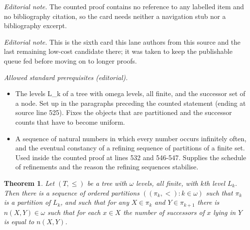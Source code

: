 \documentclass[10pt,a4paper]{amsart}
\newtheorem{theorem}{Theorem}[section]
\begin{document}
\noindent\textit{Editorial note.} The counted proof contains no reference to any labelled item and no bibliography citation, so the card needs neither a navigation stub nor a bibliography excerpt.\par\medskip
\noindent\textit{Editorial note.} This is the sixth card this lane authors from this source and the last remaining low-cost candidate there; it was taken to keep the publishable queue fed before moving on to longer proofs.\par\medskip
\noindent\textit{Allowed standard prerequisites (editorial).}\begin{itemize}
\item The levels L\_k of a tree with omega levels, all finite, and the successor set of a node. Set up in the paragraphs preceding the counted statement (ending at source line 525). Fixes the objects that are partitioned and the successor counts that have to become uniform.
\item A sequence of natural numbers in which every number occurs infinitely often, and the eventual constancy of a refining sequence of partitions of a finite set. Used inside the counted proof at lines 532 and 546-547. Supplies the schedule of refinements and the reason the refining sequences stabilise.
\end{itemize}\medskip
\begin{theorem} Let $(T, \le)$ be a tree with $\omega$ levels, all finite, with $k$th level $L_k$. 
Then there is a sequence of ordered partitions $((\pi_k, <): k \in \omega)$ such that $\pi_k$ is a partition
of $L_k$, and such that for any $X \in \pi_k$ and $Y \in \pi_{k+1}$ there is $n(X,Y) \in \omega$ such that for
each $x \in X$ the number of successors of $x$ lying in $Y$ is equal to $n(X,Y)$. \label{4.2}  \end{theorem}
\end{document}
